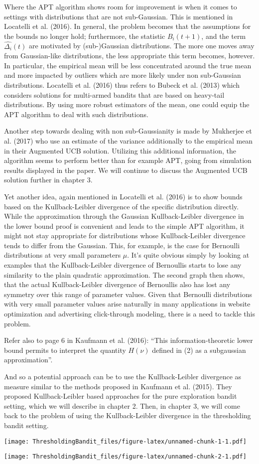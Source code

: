 \documentclass[12pt,]{article}
\begin{document}
Where the APT algorithm shows room for improvement is when it comes to
settings with distributions that are not sub-Gaussian. This is mentioned
in Locatelli et al. (2016). In general, the problem becomes that the
assumptions for the bounds no longer hold; furthermore, the statistic
\(B_i(t+1)\), and the term \(\hat{\Delta_i}(t)\) are motivated by
(sub-)Gaussian distributions. The more one moves away from Gaussian-like
distributions, the less appropriate this term becomes, however. In
particular, the empirical mean will be less concentrated around the true
mean and more impacted by outliers which are more likely under non
sub-Gaussian distributions. Locatelli et al. (2016) thus refers to
Bubeck et al. (2013) which considers solutions for multi-armed bandits
that are based on heavy-tail distributions. By using more robust
estimators of the mean, one could equip the APT algorithm to deal with
such distributions.

Another step towards dealing with non sub-Gaussianity is made by
Mukherjee et al. (2017) who use an estimate of the variance additionally
to the empirical mean in their Augmented UCB solution. Utilizing this
additional information, the algorithm seems to perform better than for
example APT, going from simulation results displayed in the paper. We
will continue to discuss the Augmented UCB solution further in chapter
3.

Yet another idea, again mentioned in Locatelli et al. (2016) is to show
bounds based on the Kullback-Leibler divergence of the specific
distribution directly. While the approximation through the Gaussian
Kullback-Leibler divergence in the lower bound proof is convenient and
leads to the simple APT algorithm, it might not stay appropriate for
distributions whose Kullback-Leibler divergence tends to differ from the
Gaussian. This, for example, is the case for Bernoulli distributions at
very small parameters \(\mu\). It's quite obvious simply by looking at
examples that the Kullback-Leibler divergence of Bernoullis starts to
lose any similarity to the plain quadratic approximation. The second
graph then shows, that the actual Kullback-Leibler divergence of
Bernoullis also has lost any symmetry over this range of parameter
values. Given that Bernoulli distributions with very small parameter
values arise naturally in many applications in website optimization and
advertising click-through modeling, there is a need to tackle this
problem.

Refer also to page 6 in Kaufmann et al. (2016): ``This
information-theoretic lower bound permits to interpret the quantity
\(H(\nu)\) defined in (2) as a subgaussian approximation''.

And so a potential approach can be to use the Kullback-Leibler
divergence as measure similar to the methods proposed in Kaufmann et al.
(2015). They proposed Kullback-Leibler based approaches for the pure
exploration bandit setting, which we will describe in chapter 2. Then,
in chapter 3, we will come back to the problem of using the
Kullback-Leibler divergence in the thresholding bandit setting.

\texttt{[image: ThresholdingBandit\_files/figure-latex/unnamed-chunk-1-1.pdf]}

\texttt{[image: ThresholdingBandit\_files/figure-latex/unnamed-chunk-2-1.pdf]}
\end{document}
